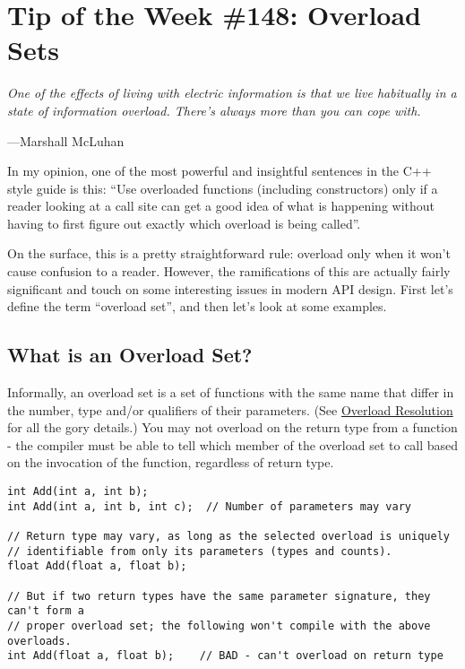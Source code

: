
\chapter{Tip of the Week \#148: Overload Sets}\label{ch:tip-of-the-week-148}
\epigraph{\itshape One of the effects of living with electric information is that we live habitually in a state of information overload. There’s always more than you can cope with.}{---Marshall McLuhan}

In my opinion, one of the most powerful and insightful sentences in the C++ style guide is this: \enquote{Use overloaded functions (including constructors) only if a reader looking at a call site can get a good idea of what is happening without having to first figure out exactly which overload is being called}.

On the surface, this is a pretty straightforward rule: overload only when it won’t cause confusion to a reader. However, the ramifications of this are actually fairly significant and touch on some interesting issues in modern API design. First let’s define the term \enquote{overload set}, and then let’s look at some examples.

\section{What is an Overload Set?}
Informally, an overload set is a set of functions with the same name that differ in the number, type and/or qualifiers of their parameters. (See \href{http://en.cppreference.com/w/cpp/language/overload_resolution}{Overload Resolution} for all the gory details.) You may not overload on the return type from a function - the compiler must be able to tell which member of the overload set to call based on the invocation of the function, regardless of return type.

\begin{verbatim}
int Add(int a, int b);
int Add(int a, int b, int c);  // Number of parameters may vary

// Return type may vary, as long as the selected overload is uniquely
// identifiable from only its parameters (types and counts).
float Add(float a, float b);

// But if two return types have the same parameter signature, they can't form a
// proper overload set; the following won't compile with the above overloads.
int Add(float a, float b);    // BAD - can't overload on return type
\end{verbatim}

